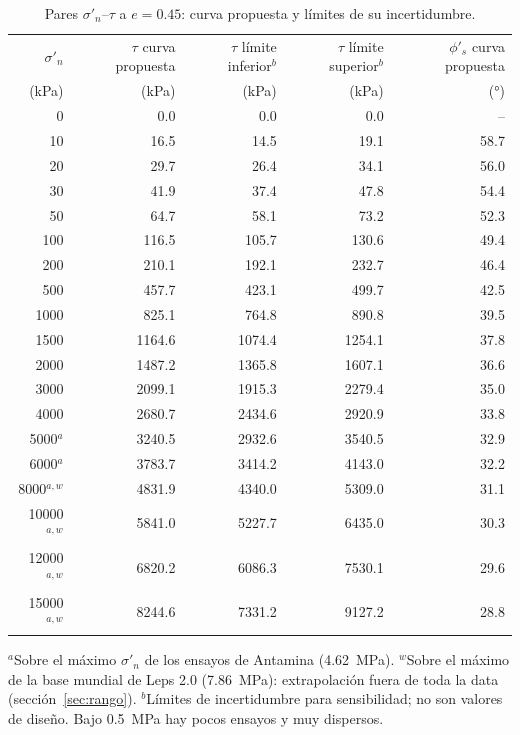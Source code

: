 \documentclass[11pt,letterpaper]{article}
\begin{document}
\begin{table}[!htbp]\centering\small\caption{Pares $\sigma'_n$--$\tau$ a $e = 0.45$: curva propuesta y límites de su incertidumbre.}\label{tab:slide}
\begin{tabular}{rrrrr}\toprule $\sigma'_n$ & $\tau$ curva propuesta & $\tau$ límite inferior$^{b}$ & $\tau$ límite superior$^{b}$ & $\phi'_s$ curva propuesta\\
(kPa) & (kPa) & (kPa) & (kPa) & (°)\\\midrule
0 & 0.0 & 0.0 & 0.0 & -- \\
10 & 16.5 & 14.5 & 19.1 & 58.7 \\
20 & 29.7 & 26.4 & 34.1 & 56.0 \\
30 & 41.9 & 37.4 & 47.8 & 54.4 \\
50 & 64.7 & 58.1 & 73.2 & 52.3 \\
100 & 116.5 & 105.7 & 130.6 & 49.4 \\
200 & 210.1 & 192.1 & 232.7 & 46.4 \\
500 & 457.7 & 423.1 & 499.7 & 42.5 \\
1000 & 825.1 & 764.8 & 890.8 & 39.5 \\
1500 & 1164.6 & 1074.4 & 1254.1 & 37.8 \\
2000 & 1487.2 & 1365.8 & 1607.1 & 36.6 \\
3000 & 2099.1 & 1915.3 & 2279.4 & 35.0 \\
4000 & 2680.7 & 2434.6 & 2920.9 & 33.8 \\
5000$^{a}$ & 3240.5 & 2932.6 & 3540.5 & 32.9 \\
6000$^{a}$ & 3783.7 & 3414.2 & 4143.0 & 32.2 \\
8000$^{a,w}$ & 4831.9 & 4340.0 & 5309.0 & 31.1 \\
10000$^{a,w}$ & 5841.0 & 5227.7 & 6435.0 & 30.3 \\
12000$^{a,w}$ & 6820.2 & 6086.3 & 7530.1 & 29.6 \\
15000$^{a,w}$ & 8244.6 & 7331.2 & 9127.2 & 28.8 \\
\bottomrule\end{tabular}\par\vspace{3pt}\footnotesize $^{a}$Sobre el máximo $\sigma'_n$ de los ensayos de Antamina (4.62~MPa). $^{w}$Sobre el máximo de la base mundial de Leps 2.0 (7.86~MPa): extrapolación fuera de toda la data (sección~\ref{sec:rango}). $^{b}$Límites de incertidumbre para sensibilidad; no son valores de diseño. Bajo 0.5~MPa hay pocos ensayos y muy dispersos.\end{table}
\end{document}
